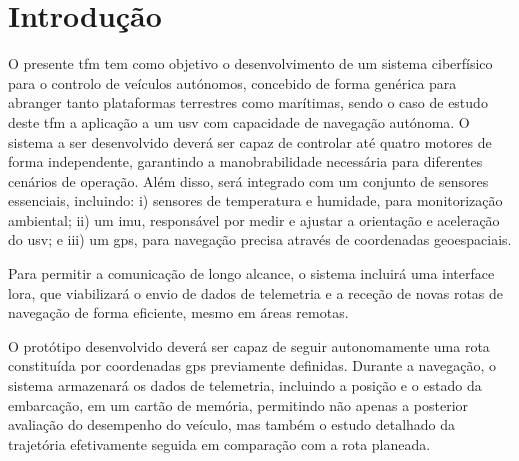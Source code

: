 


\chapter{Introdução}
\label{ch:introducao}

O presente \gls{tfm} tem como objetivo o desenvolvimento de um sistema ciberfísico para o controlo de veículos autónomos, concebido de forma genérica para abranger tanto plataformas terrestres como marítimas, sendo o caso de estudo deste \gls{tfm} a aplicação a um \gls{usv} com capacidade de navegação autónoma. O sistema a ser desenvolvido deverá ser capaz de controlar até quatro motores de forma independente, garantindo a manobrabilidade necessária para diferentes cenários de operação. Além disso, será integrado com um conjunto de sensores essenciais, incluindo: i) sensores de temperatura e humidade, para monitorização ambiental; ii) um \gls{imu}, responsável por medir e ajustar a orientação e aceleração do \gls{usv}; e iii) um \gls{gps}, para navegação precisa através de coordenadas geoespaciais.

Para permitir a comunicação de longo alcance, o sistema incluirá uma interface \gls{lora}, que viabilizará o envio de dados de telemetria e a receção de novas rotas de navegação de forma eficiente, mesmo em áreas remotas.

O protótipo desenvolvido deverá ser capaz de seguir autonomamente uma rota constituída por coordenadas \gls{gps} previamente definidas. Durante a navegação, o sistema armazenará os dados de telemetria, incluindo a posição e o estado da embarcação, em um cartão de memória, permitindo não apenas a posterior avaliação do desempenho do veículo, mas também o estudo detalhado da trajetória efetivamente seguida em comparação com a rota planeada.

